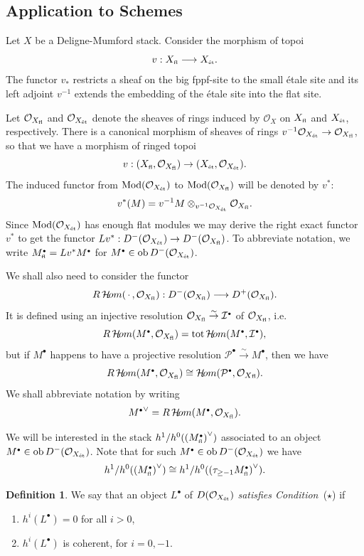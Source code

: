\documentclass[11pt]{article}
\theoremstyle{plain}
\theoremstyle{definition}
\newtheorem{defnp}[prop]{Definition}
\newenvironment{defn}{\begin{defnp}\normalfont}{\end{defnp}}
\newcommand{\dual}[1]{{{#1}^{\vee}}}
\newcommand{\et}{{\mbox{\tiny \'{e}t}}}
\newcommand{\fl}{{\mbox{\tiny fl}}}
\newcommand{\upst}{^{\ast}}
\newcommand{\lst}{_{\ast}}
\newcommand{\com}{^{\scriptscriptstyle\bullet}}
\newcommand{\argument}{{{\,\cdot\,}}}
\renewcommand{\O}{{\mathcal{O}}}
\newcommand{\iI}{{\mathcal{I}}}
\newcommand{\hH}{{\mathcal{H}}}
\newcommand{\pP}{{\mathcal{P}}}
\newcommand{\tot}{\mathop{\rm tot}}
\newcommand{\Mod}{\mathop{\rm Mod}\nolimits}
\newcommand{\ob}{\mathop{\rm ob}}
\newcommand{\sheafhom}{\mathop{\rm {\mit{ \hH\! om}}}\nolimits}
\newcommand{\iso}{\stackrel{\sim}{\rightarrow}}
\theoremstyle{plain}
\theoremstyle{definition}
\theoremstyle{remark}
\begin{document}
\subsection{Application to Schemes}

Let \(X\) be a Deligne-Mumford stack. Consider the morphism of topoi
\[
v:X_\fl\longrightarrow X_\et.
\]
The functor \(v\lst\) restricts a sheaf on the
big fppf-site to the small \'etale site and its left adjoint \(v^{-1}\) extends
the embedding of the \'etale site into the flat site.

Let \(\O_{X_\fl}\) and \(\O_{X_\et}\) denote the sheaves of rings induced by \(\O_X\)
on \(X_\fl\) and
\(X_\et\), respectively. There is a canonical morphism of sheaves of rings
\(v^{-1}\O_{X_\et}\rightarrow\O_{X_\fl}\), so that we have a morphism of ringed
topoi
\[
v:(X_\fl,\O_{X_\fl})\rightarrow (X_{\et},\O_{X_\et}).
\]
The induced functor
{}from \(\Mod(\O_{X_\et})\) to \(\Mod(\O_{X_\fl})\) will be denoted by \(v\upst\):
\[
v\upst(M)=v^{-1}M\otimes_{v^{-1}\O_{X_\et}}\O_{X_\fl}.
\]
Since
\(\Mod(\O_{X_\et})\) has enough flat modules we may derive the right exact
functor
\(v\upst\) to get the functor \(Lv\upst:D^-(\O_{X_\et})\rightarrow
D^-(\O_{X_\fl})\). To abbreviate notation, we write \(M_\fl\com=Lv\upst M\com\)
for
\(M\com\in\ob D^-(\O_{X_\et})\).

We shall also need to consider the functor
\[
R\sheafhom(\argument,\O_{X_\fl}):D^-(\O_{X_\fl})\longrightarrow
D^+(\O_{X_\fl}).
\]
It is defined using an injective resolution
\(\O_{X_\fl}\iso\iI\com\) of \(\O_{X_\fl}\), i.e.\
\[
R\sheafhom(M\com,\O_{X_\fl})=\tot\sheafhom(M\com,\iI\com),
\]
but if \(M\com\)
happens to have a projective resolution \(\pP\com\iso M\com\), then we have
\[
R\sheafhom(M\com,\O_{X_\fl})\cong\sheafhom(\pP\com,\O_{X\fl}).
\]
We shall
abbreviate notation by writing
\[
\dual{M\com}=R\sheafhom(M\com,\O_{X_\fl}).
\]

We will be interested in the stack \(h^1/h^0(\dual{(M\com_\fl)})\) associated to
an object
\(M\com\in\ob D^-(\O_{X_\et})\). Note that for such \(M\com\in\ob D^-(\O_{X_\et})\)
we have
\[
h^1/h^0(\dual{(M\com_\fl)})\cong h^1/h^0(\dual{(\tau_{\geq-1}M\com_\fl)}).
\]

\begin{defn} \label{dost} We say that an object \(L\com\) of
\(D(\O_{X_\et})\) {\em satisfies Condition~}(\(\star\)) if
\begin{enumerate}
\item \(h^i(L\com)=0\) for all \(i>0\),
\item \(h^i(L\com)\) is coherent, for \(i=0,-1\).
\end{enumerate}
\end{defn}
\end{document}
